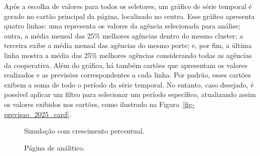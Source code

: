 \documentclass[
  12pt,
  a4paper,
]{scrreprt}
\begin{document}
Após a escolha de valores para todos os seletores, um gráfico de série
temporal é gerado no cartão principal da página, localizado no centro.
Esse gráfico apresenta quatro linhas: uma representa os valores da
agência selecionada para análise; outra, a média mensal das 25\%
melhores agências dentro do mesmo cluster; a terceira exibe a média
mensal das agências do mesmo porte; e, por fim, a última linha mostra a
média das 25\% melhores agências considerando todas as agências da
cooperativa. Além do gráfico, há também cartões que apresentam os
valores realizados e as previsões correspondentes a cada linha. Por
padrão, esses cartões exibem a soma de todo o período da série temporal.
No entanto, caso desejado, é possível aplicar um filtro para selecionar
um período específico, atualizando assim os valores exibidos nos
cartões, como ilustrado na Figura~\ref{fig-previsao_2025_card}.

\begin{figure}


\caption{\label{fig-simula_cresc_perc}Simulação com crescimento
percentual.}

\end{figure}%

\begin{figure}


\caption{\label{fig-analitico}Página de análitico.}

\end{figure}%
\end{document}
